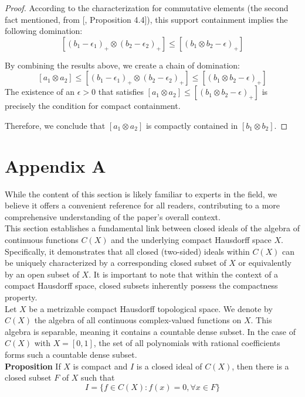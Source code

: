 \documentclass{iopconfser}
\theoremstyle{definition}
\begin{document}
\begin{proof}
    According to the characterization for commutative elements (the second fact mentioned, from [\cite{GarPer}, Proposition 4.4]), this support containment implies the following domination:
    $$[(b_1-\epsilon_1)_+ \otimes (b_2-\epsilon_2)_+]\leq [(b_1 \otimes b_2-\epsilon)_+] $$

    By combining the results above, we create a chain of domination:
    $$[a_1 \otimes a_2] \leq [(b_1-\epsilon_1)_+\otimes (b_2-\epsilon_2)_+]\leq [(b_1 \otimes b_2-\epsilon)_+]$$
    The existence of an $\epsilon>0$ that satisfies $[a_1 \otimes a_2] \leq [(b_1 \otimes b_2-\epsilon)_+]$  is precisely the condition for compact containment.

    Therefore, we conclude that $[a_1 \otimes a_2]$  is compactly contained in $[b_1 \otimes b_2]$. 


\end{proof}
\section{Appendix A} While the content of this section is likely familiar to experts in the field, we believe it offers a convenient reference for all readers, contributing to a more comprehensive understanding of the paper's overall context.\\
\indent This section establishes a fundamental link between closed ideals of the algebra of continuous functions $C(X)$ and the underlying compact Hausdorff space $X$. Specifically, it demonstrates that all closed (two-sided) ideals within $C(X)$ can be uniquely characterized by a corresponding closed subset of $X$ or equivalently by an open subset of $X$. It is important to note that within the context of a compact Hausdorff space, closed subsets inherently possess the compactness property.\\
\indent Let $X$ be a metrizable compact Hausdorff topological space. We denote by $C(X)$ the algebra of all continuous complex-valued functions on $X$. This algebra is separable, meaning it contains a countable dense subset. In the case of $C(X)$ with $X=[0,1]$, the set of all polynomials with rational coefficients forms such a countable dense subset.\\

{\bf Proposition} If $X$ is compact and $I$ is a closed ideal of $C(X)$, then there is a closed subset $F$ of $X$ such that 
$$I=\{ f \in C(X): f(x)=0, \forall x \in F\}$$
\end{document}
